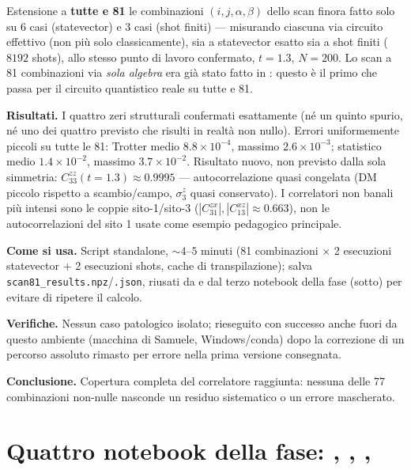 \documentclass[11pt,a4paper]{article}
\begin{document}
Estensione a \textbf{tutte e 81} le combinazioni $(i,j,\alpha,\beta)$ dello scan
finora fatto solo su 6 casi (statevector) e 3 casi (shot finiti) — misurando
ciascuna via circuito effettivo (non più solo classicamente), sia a statevector
esatto sia a shot finiti ($8192$ shots), allo stesso punto di lavoro confermato,
$t=1.3$, $N=200$. Lo scan a 81 combinazioni via \emph{sola algebra} era già stato
fatto in \texttt{}: questo è
il primo che passa per il circuito quantistico reale su tutte e 81.

\textbf{Risultati.} I quattro zeri strutturali confermati esattamente (né un
quinto spurio, né uno dei quattro previsto che risulti in realtà non nullo).
Errori uniformemente piccoli su tutte le 81: Trotter medio $8.8\times10^{-4}$,
massimo $2.6\times10^{-3}$; statistico medio $1.4\times10^{-2}$, massimo
$3.7\times10^{-2}$. Risultato nuovo, non previsto dalla sola simmetria:
$C_{33}^{zz}(t{=}1.3)\approx0.9995$ — autocorrelazione quasi congelata (DM piccolo
rispetto a scambio/campo, $\sigma_3^z$ quasi conservato). I correlatori non banali
più intensi sono le coppie sito-1/sito-3 ($|C_{31}^{zx}|,|C_{13}^{xz}|\approx0.663$),
non le autocorrelazioni del sito 1 usate come esempio pedagogico principale.

\textbf{Come si usa.} Script standalone, $\sim4$--$5$ minuti (81 combinazioni
$\times$ 2 esecuzioni statevector $+$ 2 esecuzioni shots, cache di
transpilazione); salva \texttt{scan81\_results.npz}/\texttt{.json}, riusati da
\texttt{} e dal terzo notebook della fase
(sotto) per evitare di ripetere il calcolo.

\textbf{Verifiche.} Nessun caso patologico isolato; rieseguito con successo anche
fuori da questo ambiente (macchina di Samuele, Windows/conda) dopo la correzione di
un percorso assoluto rimasto per errore nella prima versione consegnata.

\textbf{Conclusione.} Copertura completa del correlatore raggiunta: nessuna delle
77 combinazioni non-nulle nasconde un residuo sistematico o un errore mascherato.

\section*{Quattro notebook della fase: \texttt{}, \texttt{}, \texttt{}, \texttt{}}
\end{document}
